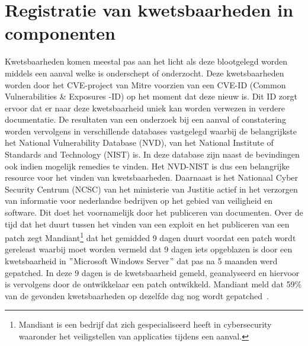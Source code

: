 \section{Registratie van kwetsbaarheden in componenten}\label{sec:registratie-van-kwetsbaarheden-in-bibliotheken}
Kwetsbaarheden komen meestal pas aan het licht als deze blootgelegd worden middels een aanval welke is onderschept of onderzocht. Deze kwetsbaarheden worden door het CVE-project van Mitre voorzien van een CVE-ID (Common Vulnerabilities \& Exposures -ID) op het moment dat deze nieuw is. Dit ID zorgt ervoor dat er naar deze kwetsbaarheid uniek kan worden verwezen in verdere documentatie. De resultaten van een onderzoek bij een aanval of constatering worden vervolgens in verschillende databases vastgelegd waarbij de belangrijkste het National Vulnerability Database (NVD), van het National Institute of Standards and Technology (NIST) is.
In deze database zijn naast de bevindingen ook indien mogelijk remedies te vinden. Het NVD-NIST is dus een belangrijke resource voor het vinden van kwetsbaarheden. Daarnaast is het Nationaal Cyber Security Centrum (NCSC) van het ministerie van Justitie actief in het verzorgen van informatie voor nederlandse bedrijven op het gebied van veiligheid en software. Dit doet het voornamelijk door het publiceren van documenten.
Over de tijd dat het duurt tussen het vinden van een exploit en het publiceren van een patch zegt Mandiant\footnote{Mandiant is een bedrijf dat zich gespecialiseerd heeft in cybersecurity waaronder het veiligstellen van applicaties tijdens een aanval.} dat het gemidded 9 dagen duurt voordat een patch wordt gereleast waarbij moet worden vermeld dat 9 dagen iets opgeblazen is door een kwetsbaarheid in $"$Microsoft Windows Server$"$ dat pas na 5 maanden werd gepatched. In deze 9 dagen is de kwetsbaarheid gemeld, geanalyseerd en hiervoor is vervolgens door de ontwikkelaar een patch ontwikkeld. Mandiant meld dat 59\% van de gevonden kwetsbaarheden op dezelfde dag nog wordt gepatched~\citep{mandiant:2020}.

